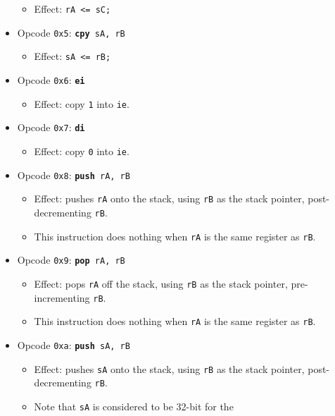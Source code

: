 \documentclass{article}
\begin{document}
\begin{itemize}
\begin{itemize}
		\item Effect: \texttt{rA <= sC;}
		\end{itemize}
	\item Opcode \texttt{0x5}:
		\texttt{\textbf{cpy} sA, rB}
		\begin{itemize}
		\item Effect: \texttt{sA <= rB;}
		\end{itemize}
	\item Opcode \texttt{0x6}:
		\texttt{\textbf{ei}}
		\begin{itemize}
		\item Effect: copy \texttt{1} into \texttt{ie}.
		\end{itemize}
	\item Opcode \texttt{0x7}:
		\texttt{\textbf{di}}
		\begin{itemize}
		\item Effect: copy \texttt{0} into \texttt{ie}.
		\end{itemize}
	\item Opcode \texttt{0x8}:
		\texttt{\textbf{push} rA, rB}
		\begin{itemize}
		\item Effect: pushes \texttt{rA} onto the stack, using
		\texttt{rB} as the stack pointer, post-decrementing
		\texttt{rB}.
		\item This instruction does nothing when \texttt{rA} is the
		same register as \texttt{rB}. 
		\end{itemize}
	\item Opcode \texttt{0x9}:
		\texttt{\textbf{pop} rA, rB}
		\begin{itemize}
		\item Effect: pops \texttt{rA} off the stack, using
		\texttt{rB} as the stack pointer, pre-incrementing \texttt{rB}.
		\item This instruction does nothing when \texttt{rA} is the
		same register as \texttt{rB}. 
		\end{itemize}
	\item Opcode \texttt{0xa}:
		\texttt{\textbf{push} sA, rB}
		\begin{itemize}
		\item Effect: pushes \texttt{sA} onto the stack, using
		\texttt{rB} as the stack pointer, post-decrementing
		\texttt{rB}.
		\item Note that \texttt{sA} is considered to be 32-bit for the

\end{itemize}
\end{itemize}
\end{document}
